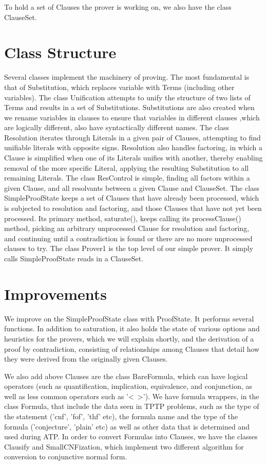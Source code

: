 \documentclass{llncs}
\begin{document}
To hold a set of Clauses the prover is working on, we also have the class ClauseSet.

\section{Class Structure}

Several classes implement the machinery of proving.  The most fundamental is that of Substitution,
which replaces variable with Terms (including other variables).   The class Unification attempts to
unify the structure of two lists of Terms and results in a set of Substitutions.  Substitutions are
also created when we rename variables in clauses to ensure that variables in different clauses
,which are logically different, also have syntactically different names.  The class Resolution
iterates through Literals in a given pair of Clauses, attempting to find unifiable literals with
opposite signs.  Resolution also handles factoring, in which a Clause is simplified when one of
its Literals unifies with another, thereby enabling removal of the more specific Literal, applying
the resulting Substitution to all remaining Literals.  The class ResControl is simple, finding
all factors within a given Clause, and all resolvants between a given Clause and ClauseSet.  The class
SimpleProofState keeps a set of Clauses that
have already been processed, which is subjected to resolution and factoring, and those Clauses that
have not yet been processed.  Its primary method, saturate(), keeps calling its processClause()
method, picking an arbitrary unprocessed Clause for resolution and factoring, and continuing until
a contradiction is found or there are no more unprocessed clauses to try.  The class Prover1 is
the top level of our simple prover.  It simply calls SimpleProofState reads in a ClauseSet.

\section{Improvements}

We improve on the SimpleProofState class with ProofState. It performs several functions.  In addition
to saturation, it also holds the state of various options and heuristics for
the provers, which we will explain shortly, and the derivation of a proof by contradiction,
consisting of relationships among Clauses that detail how they were derived from the originally
given Clauses.

We also add above Clauses are the class BareFormula, which can have logical operators (such as quantification, implication, equivalence,
and conjunction, as well as less common operators such as '<~>').  We have formula wrappers, in the class Formula,
that include the data seen in TPTP problems, such as the type of the statement ('cnf', 'fof', 'thf' etc),
the formula name and the type of the formula ('conjecture', 'plain' etc) as well as other data
that is determined and used during ATP. In order to convert Formulas
into Clauses, we have the classes Clausify and SmallCNFization, which implement two different algorithm
for conversion to conjunctive normal form.
\end{document}
